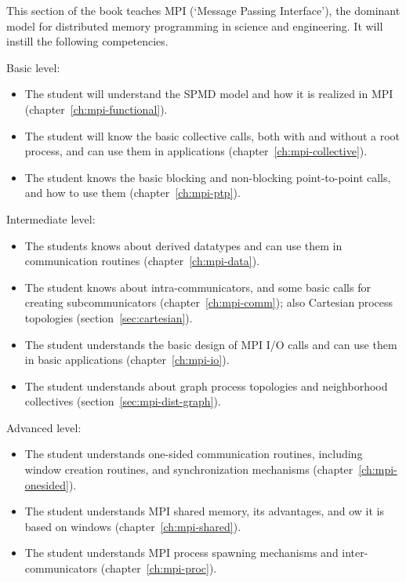 
This section of the book teaches MPI (`Message Passing Interface'),
the dominant model for distributed memory programming in science and engineering.
It will instill the following competencies.

Basic level:
\begin{itemize}
\item The student will understand the \acs{SPMD} model
  and how it is realized in MPI (chapter~\ref{ch:mpi-functional}).
\item The student will know the basic collective calls,
  both with and without a root process,
  and can use them in applications
  (chapter~\ref{ch:mpi-collective}).
\item The student knows the basic blocking and non-blocking
  point-to-point calls,
  and how to use them
  (chapter~\ref{ch:mpi-ptp}).
\end{itemize}

Intermediate level:
\begin{itemize}
\item The students knows about derived datatypes and can use them
  in communication routines
  (chapter~\ref{ch:mpi-data}).
\item The student knows about intra-communicators,
  and some basic calls for creating subcommunicators
  (chapter~\ref{ch:mpi-comm});
  also Cartesian process topologies
  (section~\ref{sec:cartesian}).
\item The student understands the basic design of MPI I/O calls
  and can use them in basic applications
  (chapter~\ref{ch:mpi-io}).
\item The student understands about graph process topologies
  and neighborhood collectives
  (section~\ref{sec:mpi-dist-graph}).
\end{itemize}

Advanced level:
\begin{itemize}
\item The student understands one-sided communication routines,
  including window creation routines, and synchronization mechanisms
  (chapter~\ref{ch:mpi-onesided}).
\item The student understands MPI shared memory, its advantages,
  and ow it is based on windows
  (chapter~\ref{ch:mpi-shared}).
\item The student understands MPI process spawning mechanisms
  and inter-communicators
  (chapter~\ref{ch:mpi-proc}).
\end{itemize}
